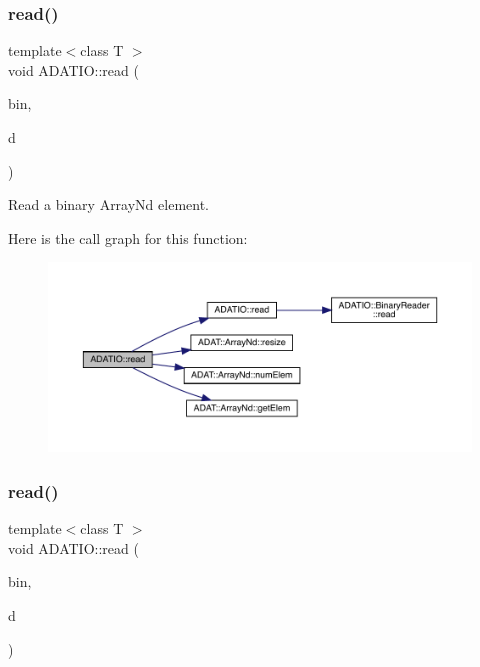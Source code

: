 \subsubsection{\texorpdfstring{read()}{read()}\hspace{0.1cm}{\footnotesize\ttfamily [23/28]}}
{\footnotesize\ttfamily template$<$class T $>$ \\
void A\+D\+A\+T\+I\+O\+::read (\begin{DoxyParamCaption}\item[{\mbox{\hyperlink{classADATIO_1_1BinaryReader}{Binary\+Reader}} \&}]{bin,  }\item[{\mbox{\hyperlink{classADAT_1_1ArrayNd}{A\+D\+A\+T\+::\+Array\+Nd}}$<$ T $>$ \&}]{d }\end{DoxyParamCaption})\hspace{0.3cm}{\ttfamily [inline]}}



Read a binary Array\+Nd element. 

Here is the call graph for this function\+:
\nopagebreak
\begin{figure}[H]
\begin{center}
\leavevmode
\includegraphics[width=350pt]{d0/dba/namespaceADATIO_a0b5c3397d644a4f522e7b097825986cb_cgraph}
\end{center}
\end{figure}
\mbox{\label{namespaceADATIO_a6f8814a83922a0b41bf9a25627b5dcfd}} 
\subsubsection{\texorpdfstring{read()}{read()}\hspace{0.1cm}{\footnotesize\ttfamily [24/28]}}
{\footnotesize\ttfamily template$<$class T $>$ \\
void A\+D\+A\+T\+I\+O\+::read (\begin{DoxyParamCaption}\item[{\mbox{\hyperlink{classADATIO_1_1BinaryReader}{Binary\+Reader}} \&}]{bin,  }\item[{std\+::vector$<$ T $>$ \&}]{d }\end{DoxyParamCaption})\hspace{0.3cm}{\ttfamily [inline]}}




